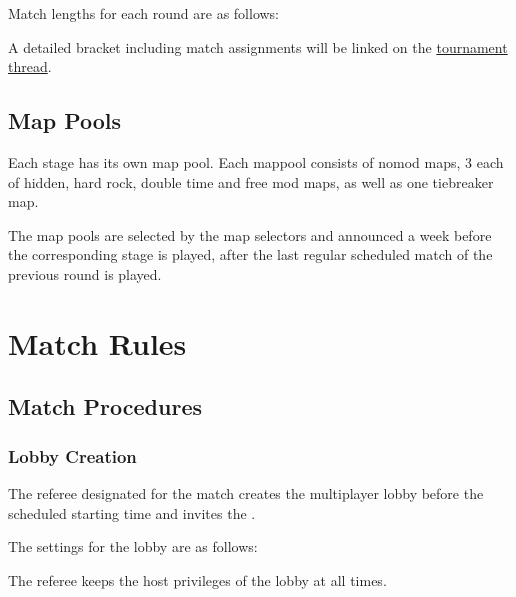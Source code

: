 \begin{samepage}
Match lengths for each round are as follows:
\matchlengths
\end{samepage}

A detailed bracket including match assignments will be linked on the \href{\thread}{tournament thread}.

\subsection{Map Pools}

Each stage has its own map pool. Each mappool consists of \numnomod nomod maps, 3 each of hidden, hard rock, double time and free mod maps, as well as one tiebreaker map.


The map pools are selected by the map selectors and announced a week before the corresponding stage is played, after the last regular scheduled match of the previous round is played.


\section{Match Rules}

\subsection{Match Procedures}

\subsubsection{Lobby Creation}
The referee designated for the match creates the multiplayer lobby \lobbyopen{} before the scheduled starting time and invites the .

\begin{samepage}
The settings for the lobby are as follows:


\end{samepage}

The referee keeps the host privileges of the lobby at all times.

